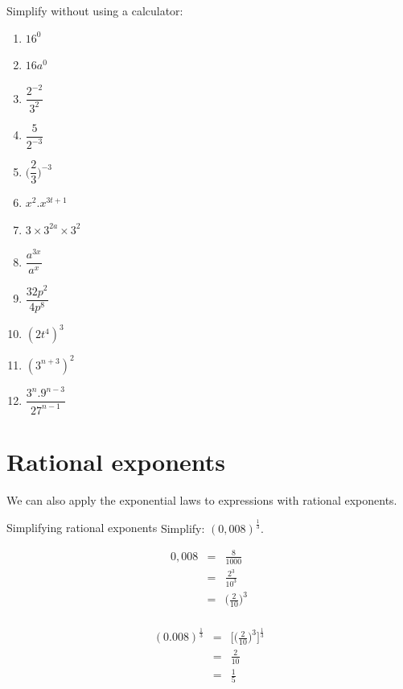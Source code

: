 \begin{exercises}{}{
Simplify without using a calculator:
\begin{multicols}{2}
\begin{enumerate}[label=\textbf{\arabic*}., itemsep=5pt]
 \item $16^0$
 \item $16a^0$
 \item $\dfrac{2^{-2}}{3^2}$
 \item $ \dfrac{5}{2^{-3}}$
 \item $ \Big(\dfrac{2}{3}\Big)^{-3} $
 \item $ x^2 . x^{3t+1} $
 \item $ 3 \times 3^{2a} \times 3^2$
 \item $ \dfrac{a^{3x}}{a^x} $
 \item $ \dfrac{32p^2}{4p^8}$
 \item $ (2t^4)^3$
 \item $ (3^{n+3})^2$
 \item $ \dfrac{3^n . 9^{n-3}}{27^{n-1}}$
\end{enumerate}
\end{multicols}
}
\end{exercises}

\section{Rational exponents}

We can also apply the exponential laws to expressions with rational exponents.

\begin{wex}
{%
Simplifying rational exponents
} 
{%
Simplify: 
$ (0,008)^{\frac{1}{3}}.$
}
{%

\begin{eqnarray*}
 0,008 & = & \frac{8}{1000} \\
       & = & \frac{2^3}{10^3} \\
       & = & \Big(\frac{2}{10}\Big)^3\\
\end{eqnarray*}

\begin{eqnarray*}
 (0.008)^{\frac{1}{3}} & = & \Big[\Big(\frac{2}{10}\Big)^3\Big]^{\frac{1}{3}} \\
		 & = & \frac{2}{10} \\
		 & = & \frac{1}{5}
\end{eqnarray*}
}
\end{wex}

